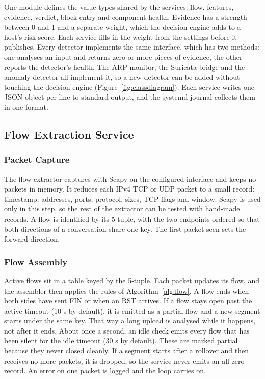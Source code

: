 \noindent One module defines the value types shared by the services: flow, features, evidence, verdict, block entry and component health. Evidence has a strength between 0 and 1 and a separate weight, which the decision engine adds to a host's risk score. Each service fills in the weight from the settings before it publishes. Every detector implements the same interface, which has two methods: one analyses an input and returns zero or more pieces of evidence, the other reports the detector's health. The ARP monitor, the Suricata bridge and the anomaly detector all implement it, so a new detector can be added without touching the decision engine (Figure~\ref{fig:classdiagram}). Each service writes one JSON object per line to standard output, and the systemd journal collects them in one format.

\subsection{Flow Extraction Service}\label{sec:7.1.5}

\subsubsection{Packet Capture}\label{sec:7.1.5.1}

\noindent The flow extractor captures with Scapy on the configured interface and keeps no packets in memory. It reduces each IPv4 TCP or UDP packet to a small record: timestamp, addresses, ports, protocol, sizes, TCP flags and window. Scapy is used only in this step, so the rest of the extractor can be tested with hand-made records. A flow is identified by its 5-tuple, with the two endpoints ordered so that both directions of a conversation share one key. The first packet seen sets the forward direction.

\subsubsection{Flow Assembly}\label{sec:7.1.5.2}

\noindent Active flows sit in a table keyed by the 5-tuple. Each packet updates its flow, and the assembler then applies the rules of Algorithm~\ref{alg:flow}. A flow ends when both sides have sent FIN or when an RST arrives. If a flow stays open past the active timeout (10 s by default), it is emitted as a partial flow and a new segment starts under the same key. That way a long upload is analysed while it happens, not after it ends. About once a second, an idle check emits every flow that has been silent for the idle timeout (30 s by default). These are marked partial because they never closed cleanly. If a segment starts after a rollover and then receives no more packets, it is dropped, so the service never emits an all-zero record. An error on one packet is logged and the loop carries on.


